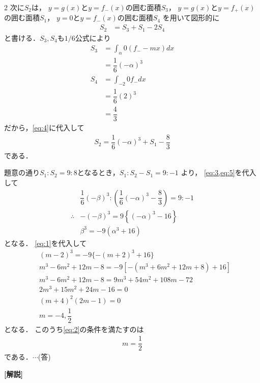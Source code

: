 \documentclass[../../main.tex]{subfiles}
\begin{document}
\begin{multicols}{2}
  次に$S_2$は，
  $y=g(x)$と$y=f_{-}(x)$の囲む面積$S_3$，
  $y=g(x)$と$y=f_{+}(x)$の囲む面積$S_1$，
  $y=0$と$y=f_{-}(x)$の囲む面積$S_4$
  を用いて図形的に
  \begin{align}
    S_2 & = S_3+S_1 - 2S_4 \label{eq:4}
  \end{align}
  と書ける．$S_3,S_4$も$1/6$公式により
  \begin{align}
    S_3
    & = \int_{\alpha}{0} \left(f_{-}-mx \right) dx \\
    & = \dfrac{1}{6}(-\alpha)^3                     \\
    S_4
    & = \int_{-2}{0} f_{-} dx                      \\
    & = \dfrac{1}{6}(2)^3                           \\
    & = \dfrac{4}{3}
  \end{align}
  だから，\cref{eq:4}に代入して
  \begin{align}
    S_2 = \dfrac{1}{6}(-\alpha)^3 + S_1 -\dfrac{8}{3} \label{eq:5}
  \end{align}
  である．

  題意の通り$S_1 : S_2 = 9:8$となるとき，$S_1 : S_2 - S_1 = 9:-1$ より，
  \cref{eq:3,eq:5}を代入して
  \begin{align}
    & \dfrac{1}{6}(-\beta)^3 : \left( \dfrac{1}{6}(-\alpha)^3 - \dfrac{8}{3} \right)  = 9:-1 \\
    \therefore
    & -(-\beta)^3 = 9\left\{ (-\alpha)^3 - 16 \right\}                                    \\
    & \beta^3  = -9(\alpha^3 + 16)
  \end{align}
  となる．
  \cref{eq:1}を代入して
  \begin{align}
    & (m-2)^3                  = -9\{ -(m+2)^3 + 16 \}             \\
    & m^3 - 6m^2 + 12m - 8     = -9[ -(m^3 + 6m^2 + 12m + 8) + 16] \\
    & m^3 - 6m^2 + 12m - 8     = 9m^3 + 54m^2 + 108m - 72          \\
    & 2m^3 + 15m^2 + 24m - 16  = 0                                 \\
    & (m+4)^2 (2m-1)           = 0                                 \\
    & m = -4, \dfrac{1}{2}
  \end{align}
  となる．
  このうち\cref{eq:2}の条件を満たすのは
  \begin{align}
    m=\dfrac{1}{2}
  \end{align}
  である．$\cdots$(答)

  {\bf [解説]}

  \newpage
\end{multicols}
\end{document}
